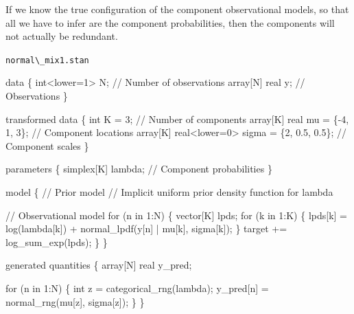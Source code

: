 \documentclass[
  letterpaper,
  DIV=11,
  numbers=noendperiod]{scrartcl}
\newenvironment{Shaded}{\begin{snugshade}}{\end{snugshade}}
\newcommand{\CommentTok}[1]{\textcolor[rgb]{0.37,0.37,0.37}{#1}}
\newcommand{\ControlFlowTok}[1]{\textcolor[rgb]{0.00,0.23,0.31}{#1}}
\newcommand{\DataTypeTok}[1]{\textcolor[rgb]{0.68,0.00,0.00}{#1}}
\newcommand{\DecValTok}[1]{\textcolor[rgb]{0.68,0.00,0.00}{#1}}
\newcommand{\FloatTok}[1]{\textcolor[rgb]{0.68,0.00,0.00}{#1}}
\newcommand{\KeywordTok}[1]{\textcolor[rgb]{0.00,0.23,0.31}{#1}}
\newcommand{\NormalTok}[1]{\textcolor[rgb]{0.00,0.23,0.31}{#1}}
\begin{document}
If we know the true configuration of the component observational models,
so that all we have to infer are the component probabilities, then the
components will not actually be redundant.

\begin{codelisting}

\caption{\texttt{normal\textbackslash\_mix1.stan}}

\begin{Shaded}
\begin{Highlighting}[]
\KeywordTok{data}\NormalTok{ \{}
  \DataTypeTok{int}\NormalTok{\textless{}}\KeywordTok{lower}\NormalTok{=}\DecValTok{1}\NormalTok{\textgreater{} N;  }\CommentTok{// Number of observations}
  \DataTypeTok{array}\NormalTok{[N] }\DataTypeTok{real}\NormalTok{ y; }\CommentTok{// Observations}
\NormalTok{\}}

\KeywordTok{transformed data}\NormalTok{ \{}
  \DataTypeTok{int}\NormalTok{ K = }\DecValTok{3}\NormalTok{;                                    }\CommentTok{// Number of components}
  \DataTypeTok{array}\NormalTok{[K] }\DataTypeTok{real}\NormalTok{ mu = \{{-}}\DecValTok{4}\NormalTok{, }\DecValTok{1}\NormalTok{, }\DecValTok{3}\NormalTok{\};                }\CommentTok{// Component locations}
  \DataTypeTok{array}\NormalTok{[K] }\DataTypeTok{real}\NormalTok{\textless{}}\KeywordTok{lower}\NormalTok{=}\DecValTok{0}\NormalTok{\textgreater{} sigma = \{}\DecValTok{2}\NormalTok{, }\FloatTok{0.5}\NormalTok{, }\FloatTok{0.5}\NormalTok{\}; }\CommentTok{// Component scales}
\NormalTok{\}}

\KeywordTok{parameters}\NormalTok{ \{}
  \DataTypeTok{simplex}\NormalTok{[K] lambda; }\CommentTok{// Component probabilities}
\NormalTok{\}}

\KeywordTok{model}\NormalTok{ \{}
  \CommentTok{// Prior model}
  \CommentTok{// Implicit uniform prior density function for lambda}

  \CommentTok{// Observational model}
  \ControlFlowTok{for}\NormalTok{ (n }\ControlFlowTok{in} \DecValTok{1}\NormalTok{:N) \{}
    \DataTypeTok{vector}\NormalTok{[K] lpds;}
    \ControlFlowTok{for}\NormalTok{ (k }\ControlFlowTok{in} \DecValTok{1}\NormalTok{:K) \{}
\NormalTok{      lpds[k] = log(lambda[k]) + normal\_lpdf(y[n] | mu[k], sigma[k]);}
\NormalTok{    \}}
    \KeywordTok{target +=}\NormalTok{ log\_sum\_exp(lpds);}
\NormalTok{  \}}
\NormalTok{\}}

\KeywordTok{generated quantities}\NormalTok{ \{}
  \DataTypeTok{array}\NormalTok{[N] }\DataTypeTok{real}\NormalTok{ y\_pred;}

  \ControlFlowTok{for}\NormalTok{ (n }\ControlFlowTok{in} \DecValTok{1}\NormalTok{:N) \{}
    \DataTypeTok{int}\NormalTok{ z = categorical\_rng(lambda);}
\NormalTok{    y\_pred[n] = normal\_rng(mu[z], sigma[z]);}
\NormalTok{  \}}
\NormalTok{\}}
\end{Highlighting}
\end{Shaded}

\end{codelisting}
\end{document}
